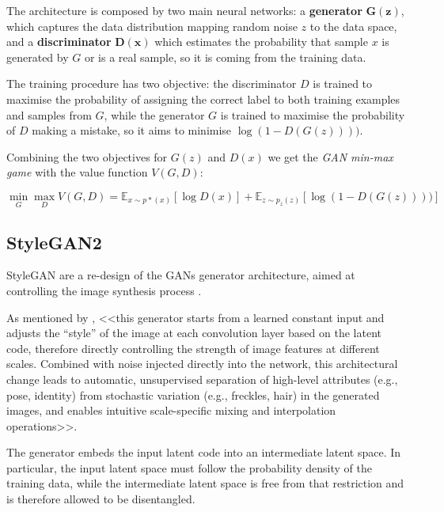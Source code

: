 \documentclass{article}
\begin{document}
	The architecture is composed by two main neural networks: a \textbf{generator} $\bm{G(z)}$, 
	which captures the data distribution mapping random noise $z$ to the data space, and a 
	\textbf{discriminator} $\bm{D(x)}$ which estimates the probability that sample $x$ is generated by 
	$G$ or is a real sample, so it is coming from the training data.

	The training procedure has two objective: the discriminator $D$ is trained to maximise the 
	probability of assigning the correct label to both training examples and samples from $G$, 
	while the generator $G$ is trained to maximise the probability of $D$ making a mistake, so it aims to 
	minimise $\log(1-D(G(z))))$.

	Combining the two objectives for $G(z)$ and $D(x)$ we get the \textit{GAN min-max game} with the 
	value 
	function $V(G,D)$:
	
	\begin{equation}
	\label{e:minmaxgame}
	\min_G \max_D V(G,D) = 
	\mathbb{E}_{x \sim p*(x)} [\log D(x)] + \mathbb E _{z \sim p_z(z)} [\log (1-D(G(z))))]
	\end{equation}
	
	\subsection{StyleGAN2}%
	StyleGAN are a re-design of the GANs generator architecture, aimed at controlling the image 
	synthesis process \cite{karras2019style}.
	
	As mentioned by \citet{karras2020analyzing}, <<this generator starts from a learned constant 
	input and adjusts the ``style'' of the image at each convolution layer based on the latent code, 
	therefore directly controlling the strength of image features at different scales. 
	Combined with noise injected directly into the network, this architectural change leads to automatic, 
	unsupervised separation of high-level attributes (e.g., pose, identity) from stochastic variation (e.g., 
	freckles, hair) in the generated images, and enables intuitive scale-specific mixing and interpolation 
	operations>>.
	
	The generator embeds the input latent code into an intermediate latent space. In particular, the input 
	latent space must follow the probability density of the training data, while the intermediate latent 
	space is free from that restriction and is therefore allowed to be disentangled. 
\end{document}
